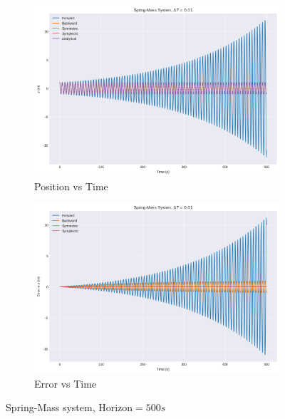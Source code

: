\documentclass[11pt]{article}
\begin{document}
\begin{figure}[H]
    \centering
    \begin{subfigure}[H]{0.49\linewidth}
        \includegraphics[width=\linewidth]{../sm12.png}
        \caption*{Position vs Time}
    \end{subfigure}
    \begin{subfigure}[H]{0.49\linewidth}
        \includegraphics[width=\linewidth]{../sm14.png}
        \caption*{Error vs Time}
    \end{subfigure}
    \caption*{Spring-Mass system, Horizon$ = 500s$}
    \end{figure}
\end{document}

